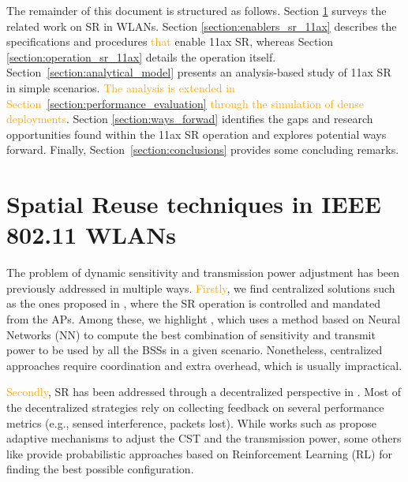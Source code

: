 \documentclass{ieeeaccess}
\begin{document}
The remainder of this document is structured as follows. Section \ref{section:previous_work_sr} surveys the related work on SR in WLANs. Section \ref{section:enablers_sr_11ax} describes the specifications and procedures \textcolor{orange}{that} enable 11ax SR, whereas Section \ref{section:operation_sr_11ax} details the operation itself. Section~\ref{section:analytical_model} presents an analysis-based study of 11ax SR in simple scenarios. \textcolor{orange}{The analysis is extended in Section~\ref{section:performance_evaluation} through the simulation of dense deployments}. Section \ref{section:ways_forwad} identifies the gaps and research opportunities found within the 11ax SR operation and explores potential ways forward. Finally, Section~\ref{section:conclusions} provides some concluding remarks.

\section{Spatial Reuse techniques in IEEE 802.11 WLANs}%
\label{section:previous_work_sr}
 
The problem of dynamic sensitivity and transmission power adjustment has been previously addressed in multiple ways. \textcolor{orange}{Firstly}, we find centralized solutions such as the ones proposed in \cite{li2011achieving, jamil2016novel, nakahira2014centralized}, where the SR operation is controlled and mandated from the APs. Among these, we highlight \cite{jamil2016novel}, which uses a method based on Neural Networks (NN) to compute the best combination of sensitivity and transmit power to be used by all the BSSs in a given scenario. Nonetheless, centralized approaches require coordination and extra overhead, which is usually impractical.

\textcolor{orange}{Secondly}, SR has been addressed through a decentralized perspective in \cite{chevillat2005dynamic, tang2011improving, chau2017effective, wilhelmi2019collaborative, wilhelmi2019potential}. Most of the decentralized strategies rely on collecting feedback on several performance metrics (e.g., sensed interference, packets lost). While works such as \cite{chevillat2005dynamic, tang2011improving, chau2017effective} propose adaptive mechanisms to adjust the CST and the transmission power, some others like \cite{wilhelmi2019collaborative, wilhelmi2019potential} provide probabilistic approaches based on Reinforcement Learning (RL) for finding the best possible configuration. 
\end{document}

